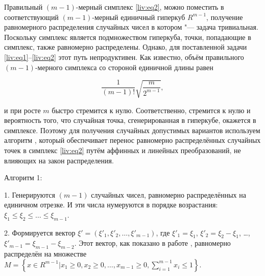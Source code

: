Правильный $(m-1)$-мерный симплекс \eqref{liv:eq2}, можно поместить в соответствующий $(m-1)$-мерный единичный гиперкуб $R^{m-1}$, получение равномерного распределения случайных чисел в котором "--- задача тривиальная. Поскольку симплекс является подмножеством гиперкуба, точки, попадающие в симплекс, также равномерно распределены. Однако, для поставленной задачи \eqref{liv:eq1}--\eqref{liv:eq2} этот путь непродуктивен. Как известно, объём правильного $(m-1)$-мерного симплекса со стороной единичной длины равен

$$

\frac{1}{(m - 1)!}\sqrt{\frac{m}{2^{m-1}}},

$$

и при росте $m$ быстро стремится к нулю. Соответственно, стремится к нулю и вероятность того, что случайная точка, сгенерированная в гиперкубе, окажется в симплексе. Поэтому для получения случайных допустимых вариантов используем алгоритм \cite{liv:bib:16, liv:bib:17}, который обеспечивает перенос равномерно распределённых случайных точек в симплекс \eqref{liv:eq2} путём аффинных и линейных преобразований, не влияющих на закон распределения.



Алгоритм 1:



1. Генерируются $(m-1)$ случайных чисел, равномерно распределённых на единичном отрезке. И эти числа нумеруются в порядке возрастания: $\xi_1\le\xi_2\le\dots\le\xi_{m-1}$. 



2. Формируется вектор $\xi'=(\xi'_1,\xi'_2,\dots,\xi'_{m-1})$, где $\xi'_1=\xi_1$, $\xi'_2=\xi_2-\xi_1$, \ldots, $\xi'_{m-1}=\xi_{m-1}-\xi_{m-2}$. Этот вектор, как показано в работе \cite{liv:bib:16}, равномерно распределён на множестве $M=\left\{x\in R^{m-1}\vert x_1\ge0,x_2\ge0,\dots,x_{m-1}\ge0,\sum\limits_{i=1}^{m-1}{x_i\le1}\right\}$.



